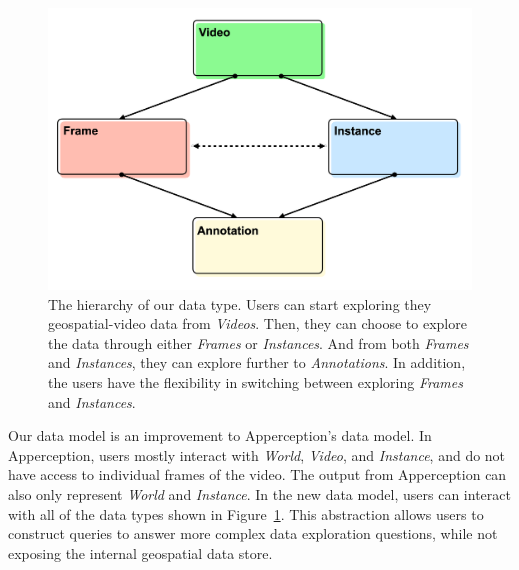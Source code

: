 \newcommand{\dataHierarchyCaption}{
The hierarchy of our data type.
Users can start exploring they geospatial-video data from \emph{Videos}.
Then, they can choose to explore the data through either \emph{Frames} or \emph{Instances}.
And from both \emph{Frames} and \emph{Instances}, they can explore further to \emph{Annotations}.
In addition, the users have the flexibility in switching between exploring \emph{Frames} and \emph{Instances}.
}

\begin{figure}[ht]
    \centering
    \includegraphics[width=\columnwidth]{figures/data-hierarchy.png}
    \caption{\dataHierarchyCaption}
    \label{fig:hierarchy}
\end{figure}

Our data model is an improvement to Apperception's data model.
In Apperception, users mostly interact with \emph{World}, \emph{Video}, and \emph{Instance}, and do not have access to individual frames of the video.
The output from Apperception can also only represent \emph{World} and \emph{Instance}.
In the new data model, users can interact with all of the data types shown in Figure~\ref{fig:hierarchy}.
This abstraction allows users to construct queries to answer more complex data exploration questions,
while not exposing the internal geospatial data store.
